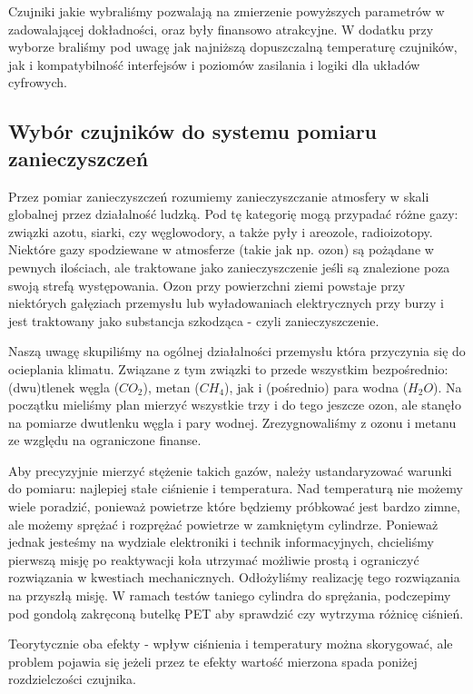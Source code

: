 \documentclass[a4paper,12pt]{article}
\begin{document}
Czujniki jakie wybraliśmy pozwalają na zmierzenie powyższych parametrów w zadowalającej dokładności, oraz były finansowo atrakcyjne. W dodatku przy wyborze braliśmy pod uwagę jak najniższą dopuszczalną temperaturę czujników, jak i kompatybilność interfejsów i poziomów zasilania i logiki dla układów cyfrowych.

\subsection{Wybór czujników do systemu pomiaru zanieczyszczeń}

Przez pomiar zanieczyszczeń rozumiemy zanieczyszczanie atmosfery w skali globalnej przez działalność ludzką. Pod tę kategorię mogą przypadać różne gazy: związki azotu, siarki, czy węglowodory, a także pyły i areozole, radioizotopy. Niektóre gazy spodziewane w atmosferze (takie jak np. ozon) są pożądane w pewnych ilościach, ale traktowane jako zanieczyszczenie jeśli są znalezione poza swoją strefą występowania. Ozon przy powierzchni ziemi powstaje przy niektórych gałęziach przemysłu lub wyładowaniach elektrycznych przy burzy i jest traktowany jako substancja szkodząca - czyli zanieczyszczenie.

Naszą uwagę skupiliśmy na ogólnej działalności przemysłu która przyczynia się do ocieplania klimatu. Związane z tym związki to przede wszystkim bezpośrednio: (dwu)tlenek węgla ($CO_2$), metan ($CH_4$), jak i (pośrednio) para wodna ($H_2O$). Na początku mieliśmy plan mierzyć wszystkie trzy i do tego jeszcze ozon, ale stanęło na pomiarze dwutlenku węgla i pary wodnej. Zrezygnowaliśmy z ozonu i metanu ze względu na ograniczone finanse. 

Aby precyzyjnie mierzyć stężenie takich gazów, należy ustandaryzować warunki do pomiaru: najlepiej stałe ciśnienie i temperatura. Nad temperaturą nie możemy wiele poradzić, ponieważ powietrze które będziemy próbkować jest bardzo zimne, ale możemy sprężać i rozprężać powietrze w zamkniętym cylindrze. Ponieważ jednak jesteśmy na wydziale elektroniki i technik informacyjnych, chcieliśmy pierwszą misję po reaktywacji koła utrzymać możliwie prostą i ograniczyć rozwiązania w kwestiach mechanicznych. Odłożyliśmy realizację tego rozwiązania na przyszłą misję. W ramach testów taniego cylindra do sprężania, podczepimy pod gondolą zakręconą butelkę PET aby sprawdzić czy wytrzyma różnicę ciśnień.

Teorytycznie oba efekty - wpływ ciśnienia i temperatury można skorygować, ale problem pojawia się jeżeli przez te efekty wartość mierzona spada poniżej rozdzielczości czujnika.
\end{document}

